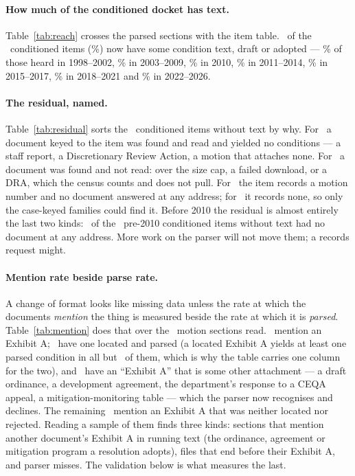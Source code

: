 \documentclass[11pt]{article}
\newcommand{\cctable}[1]{\FloatBarrier\def\cctab{#1}}
\begin{document}
\cctable{coverage}

\paragraph{How much of the conditioned docket has text.} Table~\ref{tab:reach} crosses the
parsed sections with the item table. \ccCondWithText\ of the \ccCondItems\ conditioned items
(\ccCondWithTextPct\%) now have some condition text, draft or adopted --- \ccReachEarlyHtml\% of
those heard in 1998--2002, \ccReachLateHtml\% in 2003--2009, \ccReachTwentyTen\% in 2010,
\ccReachEarlyPdf\% in 2011--2014, \ccReachMidPdf\% in 2015--2017, \ccReachVault\% in 2018--2021
and \ccReachRecent\% in 2022--2026.

\cctable{reach}

\paragraph{The residual, named.} Table~\ref{tab:residual} sorts the \ccCondNoText\ conditioned
items without text by why. For \ccResFoundRead\ a document keyed to the item was found and read
and yielded no conditions --- a staff report, a Discretionary Review Action, a motion that
attaches none. For \ccResFoundUnread\ a document was found and not read: over the size cap,
a failed download, or a DRA, which the census counts and does not pull. For \ccResNoneNumber\
the item records a motion number and no document answered at any address; for
\ccResNoneNoNumber\ it records none, so only the case-keyed families could find it. Before
2010 the residual is almost entirely the last two kinds: \ccResPreTenNone\ of the
\ccResPreTen\ pre-2010 conditioned items without text had no document at any address. More
work on the parser will not move them; a records request might.

\cctable{residual}

\paragraph{Mention rate beside parse rate.} A change of format looks like missing data unless
the rate at which the documents \emph{mention} the thing is measured beside the rate at which
it is \emph{parsed}. Table~\ref{tab:mention} does that over the \ccSecRead\ motion sections
read. \ccSecMention\ mention an Exhibit A; \ccSecLocated\ have one located and parsed (a
located Exhibit A yields at least one parsed condition in all but \ccSecLocatedNone\ of them,
which is why the table carries one column for the two), and
\ccSecRejected\ have an ``Exhibit A'' that is some other attachment --- a draft ordinance, a
development agreement, the department's response to a CEQA appeal, a mitigation-monitoring
table --- which the parser now recognises and declines. The remaining \ccSecMentionNotLocated\
mention an Exhibit A that was neither located nor rejected. Reading a sample of them finds
three kinds: sections that mention another document's Exhibit A in running text (the ordinance,
agreement or mitigation program a resolution adopts), files that end before their Exhibit A,
and parser misses. The validation below is what measures the last.
\end{document}
